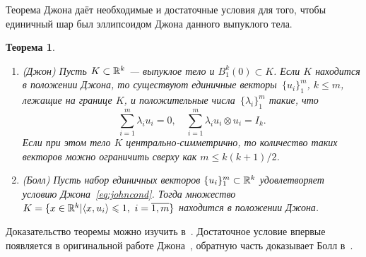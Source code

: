 \documentclass[a4paper,12pt]{article}
\newtheorem{theorem}{Теорема}[section]
\numberwithin{equation}{section}
\begin{document}
	Теорема Джона даёт необходимые и достаточные условия для того, чтобы единичный шар был эллипсоидом Джона данного выпуклого тела.
	\begin{theorem}\label{theorem:john} 
		\begin{enumerate}[label=\textnormal{(\arabic*)}]
			\item\label{itm:johnforward} (Джон) Пусть $K\subset\mathbb {R}^k$ --- выпуклое тело и $B^k_1(0)\subset K$. Если $K$ находится в положении Джона, то существуют единичные векторы~$\{u_i\}_1^m$, $k\leqslant m$, лежащие на границе $K$, и положительные числа~$\{\lambda_i\}_1^m$ такие, что
			\begin{equation}\label{eq:johncond}
				\sum_{i=1}^m\lambda_iu_i=0,\quad\displaystyle\sum_{i=1}^m\lambda_i u_i\otimes u_i=I_k.
			\end{equation}
			Если при этом тело $K$ центрально-симметрично, то количество таких векторов можно ограничить сверху как $m\leqslant k(k+1)/2$.
			\item (Болл) Пусть набор единичных векторов $\{u_i\}_1^m\subset\mathbb {R}^k$ удовлетворяет условию Джона~\eqref{eq:johncond}. Тогда множество $K=\{x\in\RR^k|\langle x,u_i\rangle\leqslant 1,\ i=\overline{1,m}\}$ находится в положении Джона.\label{itm:johnbackward}
		\end{enumerate}
	\end{theorem}
	Доказательство теоремы можно изучить в~\cite{gruber}. Достаточное условие впервые появляется в оригинальной работе Джона~\cite{john}, обратную часть доказывает Болл в~\cite{ball}.
\end{document}

